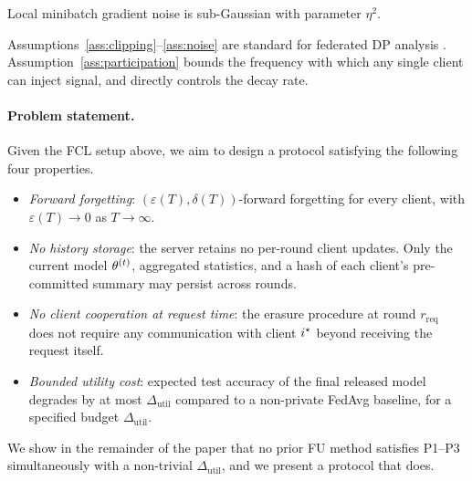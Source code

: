 \begin{assumption}
\label{ass:noise}
Local minibatch gradient noise is sub-Gaussian with parameter $\eta^2$.
\end{assumption}

Assumptions~\ref{ass:clipping}--\ref{ass:noise} are standard for federated DP analysis
\cite{mcmahan2018learning,abadi2016dpsgd}. Assumption~\ref{ass:participation} bounds the
frequency with which any single client can inject signal, and directly controls the
decay rate.

\paragraph{Problem statement.}
Given the FCL setup above, we aim to design a protocol satisfying the following four
properties.
\begin{itemize}[leftmargin=*,itemsep=1pt]
\item[\textbf{P1.}] \emph{Forward forgetting}: $(\varepsilon(T), \delta(T))$-forward
forgetting for every client, with $\varepsilon(T) \to 0$ as $T \to \infty$.
\item[\textbf{P2.}] \emph{No history storage}: the server retains no per-round client
updates. Only the current model $\theta^{(t)}$, aggregated statistics, and a hash of
each client's pre-committed summary may persist across rounds.
\item[\textbf{P3.}] \emph{No client cooperation at request time}: the erasure procedure
at round $r_{\mathrm{req}}$ does not require any communication with client $i^{\star}$
beyond receiving the request itself.
\item[\textbf{P4.}] \emph{Bounded utility cost}: expected test accuracy of the final
released model degrades by at most $\Delta_{\mathrm{util}}$ compared to a non-private
FedAvg baseline, for a specified budget $\Delta_{\mathrm{util}}$.
\end{itemize}

We show in the remainder of the paper that no prior FU method satisfies P1--P3
simultaneously with a non-trivial $\Delta_{\mathrm{util}}$, and we present a protocol
that does.
